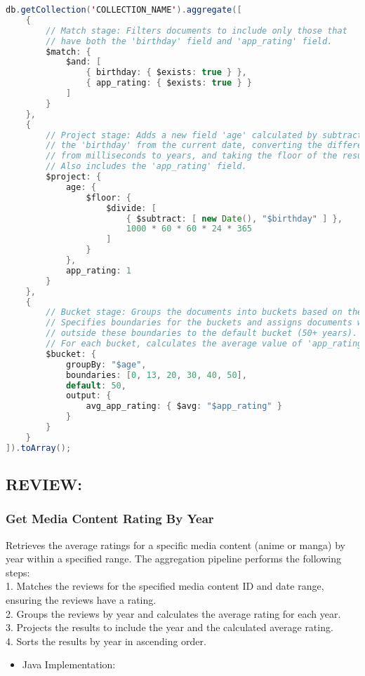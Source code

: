 \begin{mdframed}[style=customstyle]
\begin{lstlisting}[language=java]
db.getCollection('COLLECTION_NAME').aggregate([
    { 
        // Match stage: Filters documents to include only those that 
        // have both the 'birthday' field and 'app_rating' field.
        $match: { 
            $and: [
                { birthday: { $exists: true } }, 
                { app_rating: { $exists: true } }
            ]
        } 
    },
    { 
        // Project stage: Adds a new field 'age' calculated by subtracting 
        // the 'birthday' from the current date, converting the difference 
        // from milliseconds to years, and taking the floor of the result.
        // Also includes the 'app_rating' field.
        $project: { 
            age: { 
                $floor: { 
                    $divide: [
                        { $subtract: [ new Date(), "$birthday" ] },
                        1000 * 60 * 60 * 24 * 365
                    ]
                }
            },
            app_rating: 1 
        } 
    },
    { 
        // Bucket stage: Groups the documents into buckets based on the 'age' field.
        // Specifies boundaries for the buckets and assigns documents with an age 
        // outside these boundaries to the default bucket (50+ years).
        // For each bucket, calculates the average value of 'app_rating'.
        $bucket: {
            groupBy: "$age",
            boundaries: [0, 13, 20, 30, 40, 50],
            default: 50,
            output: { 
                avg_app_rating: { $avg: "$app_rating" }
            }
        }
    }
]).toArray();\end{lstlisting}
\end{mdframed}

\newpage

\subsection*{REVIEW:}

\subsubsection*{Get Media Content Rating By Year}

Retrieves the average ratings for a specific media content (anime or manga) by year within a specified range.
The aggregation pipeline performs the following steps:\\
1. Matches the reviews for the specified media content ID and date range, ensuring the reviews have a rating.\\
2. Groups the reviews by year and calculates the average rating for each year.\\
3. Projects the results to include the year and the calculated average rating.\\
4. Sorts the results by year in ascending order.
\begin{itemize}
    \item Java Implementation:
\end{itemize}

